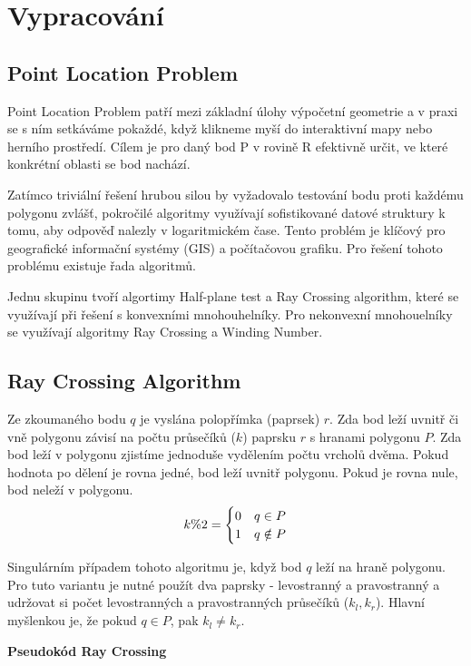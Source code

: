 \section{Vypracování}
\subsection{Point Location Problem}

Point Location Problem patří mezi základní úlohy výpočetní geometrie a v praxi se s ním setkáváme pokaždé, když klikneme myší do interaktivní mapy nebo herního prostředí.
Cílem je pro daný bod P v rovině R efektivně určit, ve které konkrétní oblasti se bod nachází. 

Zatímco triviální řešení hrubou silou by vyžadovalo testování bodu proti každému polygonu zvlášť, pokročilé algoritmy využívají sofistikované datové struktury k tomu, aby odpověď nalezly v logaritmickém čase. 
Tento problém je klíčový pro geografické informační systémy (GIS) a počítačovou grafiku. 
Pro řešení tohoto problému existuje řada algoritmů.

Jednu skupinu tvoří algortimy Half-plane test a Ray Crossing algorithm, které se využívají při řešení s konvexními mnohouhelníky. 
Pro nekonvexní mnohouelníky se využívají algoritmy Ray Crossing a Winding Number.


\subsection{Ray Crossing Algorithm}
Ze zkoumaného bodu $q$ je vyslána polopřímka (paprsek) $r$. 
Zda bod leží uvnitř či vně polygonu závisí na počtu průsečíků ($k$) paprsku $r$ s hranami polygonu $P$.
Zda bod leží v polygonu zjistíme jednoduše vydělením počtu vrcholů dvěma.
Pokud hodnota po dělení je rovna jedné, bod leží uvnitř polygonu.
Pokud je rovna nule, bod neleží v polygonu.
\[
  k \%2 = \begin{cases}
    0 & { q \in P } \\
    \newline
    1 & { q \notin P}
  \end{cases}
\]

Singulárním případem tohoto algoritmu je, když bod $q$ leží na hraně polygonu.
Pro tuto variantu je nutné použít dva paprsky - levostranný a pravostranný a udržovat si počet levostranných a pravostranných průsečíků ($k_l, k_r$). 
Hlavní myšlenkou je, že pokud $q \in P$, pak $k_l \neq k_r $.

\newpage
\textbf{Pseudokód Ray Crossing}

